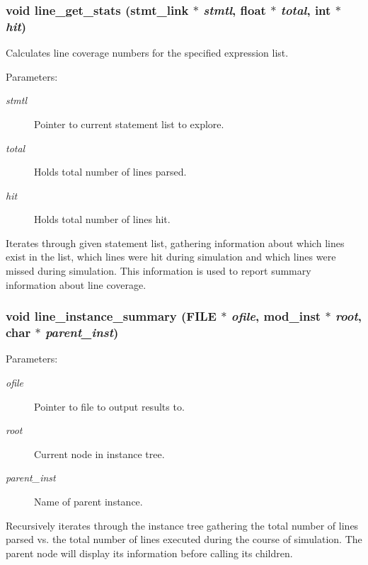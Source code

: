\subsubsection{\setlength{\rightskip}{0pt plus 5cm}void line\_\-get\_\-stats ({\bf stmt\_\-link} $\ast$ {\em stmtl}, float $\ast$ {\em total}, int $\ast$ {\em hit})}\label{line_8c_a2}


Calculates line coverage numbers for the specified expression list.

\begin{Desc}
\item[Parameters: ]\par
\begin{description}
\item[{\em 
stmtl}]Pointer to current statement list to explore. \item[{\em 
total}]Holds total number of lines parsed. \item[{\em 
hit}]Holds total number of lines hit.\end{description}
\end{Desc}
Iterates through given statement list, gathering information about which lines exist in the list, which lines were hit during simulation and which lines were missed during simulation. This information is used to report summary information about line coverage. 
\subsubsection{\setlength{\rightskip}{0pt plus 5cm}void line\_\-instance\_\-summary (FILE $\ast$ {\em ofile}, {\bf mod\_\-inst} $\ast$ {\em root}, char $\ast$ {\em parent\_\-inst})}\label{line_8c_a3}


\begin{Desc}
\item[Parameters: ]\par
\begin{description}
\item[{\em 
ofile}]Pointer to file to output results to. \item[{\em 
root}]Current node in instance tree. \item[{\em 
parent\_\-inst}]Name of parent instance.\end{description}
\end{Desc}
Recursively iterates through the instance tree gathering the total number of lines parsed vs. the total number of lines executed during the course of simulation. The parent node will display its information before calling its children. 

